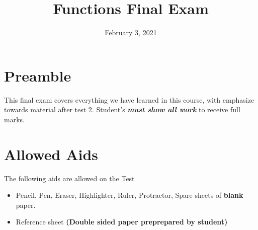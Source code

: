 \documentclass[12pt]{article} %
\title{Functions Final Exam}
\date{February 3, 2021}
\begin{document}
    \renewcommand*{\coursecode}{MCR3U Quiz} %
    \renewcommand*{\assgnnumber}{1} %
    \renewcommand*{\submdate}{November, 2021} %
    \renewcommand*{\studentfname}{\textbf{Name:}} %
    \renewcommand*{\studentlname}{} %

    \renewcommand\qedsymbol{$\blacksquare$}
    \setfigpath
    \fancyhfoffset[L,O]{0pt} %




	\maketitle
	\section{Preamble}
	This final exam covers everything we have learned in this course, with emphasize towards material after test 2. 
  Student's \emph{\textbf{must show all work}} to receive full marks.
	\section{Allowed Aids}
	The following aids are allowed on the Test
	\begin{itemize}
		\item Pencil, Pen, Eraser, Highlighter, Ruler, Protractor, Spare sheets of \textbf{blank} paper.
		\item Reference sheet \textbf{(Double sided paper preprepared by student)}
	\end{itemize}
\end{document}
